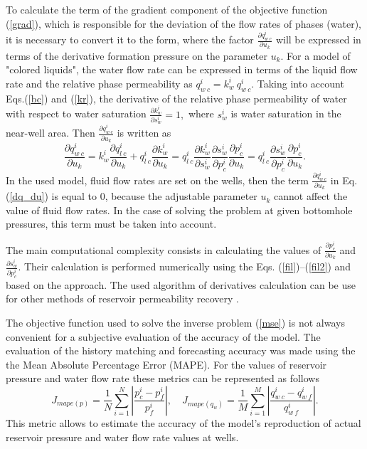 \documentclass{article}
\begin{document}
To calculate the term of the gradient  component of the objective
function (\ref{grad}), which is responsible for the deviation of the
flow rates of phases (water), it is necessary to convert it to the
form, where the factor $\frac{\partial q_{w\:c}^i}{\partial u_k}$
will be expressed in terms of the derivative formation pressure on
the parameter $u_k$. For a model of "colored liquids", the water flow
rate can be expressed in terms of the liquid flow rate and the
relative phase permeability as
$
q_{w\:c}^i = k_{w}^i \: q_{w\:c}^i.
$
Taking into account Eqs.(\ref{bc}) and (\ref{kr}), the derivative of the
relative phase permeability of water with respect to water
saturation
$
\frac{\partial k_{w}^i}{\partial s_w^i} = 1,
$
where $s_w^i$ is water saturation in the near-well area. Then $\frac{\partial q_{w\:c}^i}{\partial u_k}$ is written as
\begin{equation} \label{dq_du}
	\frac{\partial q_{w\:c}^i}{\partial u_k} = k_{w}^i  \frac{\partial
		q_{l\:c}^i}{\partial u_k} + q_{l\:c}^i \frac{\partial
		k_{w}^i}{\partial u_k} = q_{l\:c}^i \frac{\partial k_{w}^i}{\partial
		s_w^i} \frac{\partial s_w^i}{\partial p_c^i}\frac{\partial
		p_c^i}{\partial u_k} =  q_{l\:c}^i  \frac{\partial s_w^i}{\partial
		p_c^i}\frac{\partial p_c^i}{\partial u_k}.
\end{equation}
In the used model, fluid flow rates are set on the wells, then the term $\frac{\partial q_{w\:c}^i}{\partial u_k}$ in Eq. (\ref{dq_du}) is equal to 0, because the adjustable parameter $u_k$ cannot affect the value of fluid flow rates. In
the case of solving the problem at given bottomhole pressures, this
term must be taken into account.

The main computational complexity consists in calculating the values of
$\frac{\partial p_c^i}{\partial u_k}$ and $\frac{\partial
	s_w^i}{\partial p_c^i}$. Their calculation is performed numerically
using the Eqs. (\ref{fil})--(\ref{fil2}) and based on the \cite{opt}
approach. The used algorithm of derivatives calculation can be use for other methods of reservoir permeability recovery \cite{leg}.

The objective function used to solve the inverse problem
({\ref{mse}}) is not always convenient for a subjective evaluation
of the accuracy of the model. 
The evaluation of the history matching and forecasting accuracy was made using the the Mean Absolute Percentage Error (MAPE).
For the values of reservoir pressure and water
flow rate these metrics can be represented as follows
\begin{equation*} \label{mape_p}
	J_{mape(p)}=\frac{1}{N}\sum_{i=1}^N{\left|\frac{p_c^i-p_f^i}{p_f^i}\right|},\quad
	J_{mape(q_w)}=\frac{1}{M}\sum_{i=1}^M{\left|\frac{q_{w\:c}^i-q_{w\:f}^i}{q_{w\:f}^i}\right|}.
\end{equation*}
This metric allows to estimate the accuracy of the model's reproduction of actual reservoir pressure and water flow rate values at wells.
\end{document}
